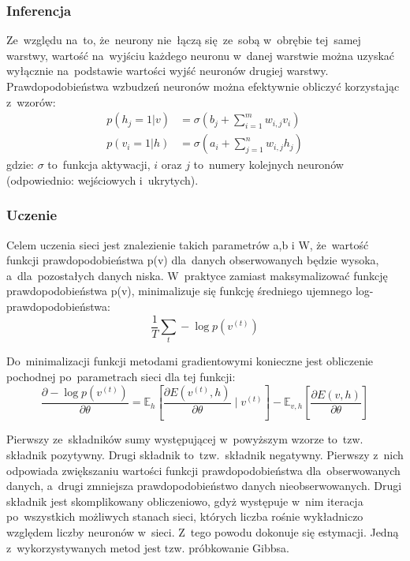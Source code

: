 \subsubsection{Inferencja}
Ze~względu na~to, że~neurony nie~łączą się~ze~sobą w~obrębie tej~samej warstwy, wartość na~wyjściu każdego
neuronu w~danej warstwie można uzyskać wyłącznie na~podstawie wartości wyjść neuronów drugiej warstwy.
Prawdopodobieństwa wzbudzeń neuronów można efektywnie obliczyć korzystając z~wzorów:
\begin{equation}
    \begin{split}
        p(h_{j}=1|v)&=\sigma(b_{j}+\sum\limits_{i=1}^{m}w_{i,j}v_{i}) \\
        p(v_{i}=1|h)&=\sigma(a_{i}+\sum\limits_{j=1}^{n}w_{i,j}h_{j})
    \end{split}
	\label{eqn:rbm_inference}
\end{equation}
gdzie: $\sigma$ to~funkcja aktywacji, $i$ oraz $j$ to~numery kolejnych neuronów (odpowiednio: wejściowych i~ukrytych).


\subsubsection{Uczenie}
Celem uczenia sieci jest znalezienie takich parametrów a,b i W, że~wartość funkcji prawdopodobieństwa p(v)
dla~danych obserwowanych będzie wysoka, a~dla~pozostałych danych niska. W~praktyce zamiast maksymalizować
funkcję prawdopodobieństwa p(v), minimalizuje się funkcję średniego ujemnego log-prawdopodobieństwa:
$$\frac{1}{T}\sum\limits_{t}-\log{p(v^{(t)})}$$

Do~minimalizacji funkcji metodami gradientowymi konieczne jest obliczenie pochodnej po~parametrach sieci
dla tej funkcji:
$$\frac{\partial-\log{p(v^{(t)})}}{\partial{\theta}}=\mathbb{E}_h[\frac{\partial{E(v^{(t)},h)}}{\partial{\theta}}\mid{v^{(t)}}]-\mathbb{E}_{v,h}[\frac{\partial{E(v,h)}}{\partial{\theta}}]$$

Pierwszy ze~składników sumy występującej w~powyższym wzorze to~tzw. składnik pozytywny. Drugi składnik
to~tzw.~składnik negatywny. Pierwszy z~nich odpowiada zwiększaniu wartości funkcji prawdopodobieństwa
dla~obserwowanych danych, a~drugi zmniejsza prawdopodobieństwo danych nieobserwowanych. Drugi składnik jest
skomplikowany obliczeniowo, gdyż występuje w~nim iteracja po~wszystkich możliwych stanach sieci, których
liczba rośnie wykładniczo względem liczby neuronów w~sieci. Z~tego powodu dokonuje się estymacji. Jedną
z~wykorzystywanych metod jest tzw. próbkowanie Gibbsa. 

